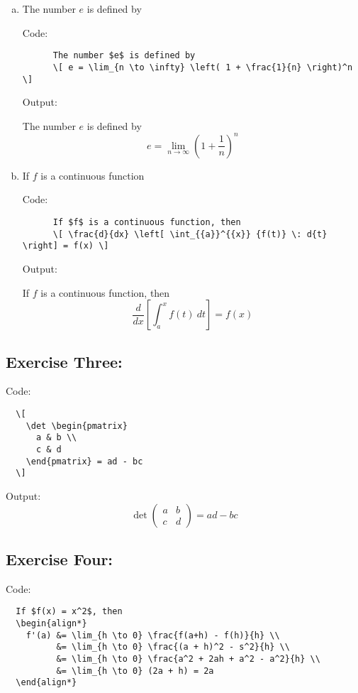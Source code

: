 \documentclass{article} %
\begin{document}
\begin{enumerate}[(a)]
  \item The number $e$ is defined by

    Code:
    \begin{verbatim}
      The number $e$ is defined by
      \[ e = \lim_{n \to \infty} \left( 1 + \frac{1}{n} \right)^n \]
    \end{verbatim}
    Output:

      The number $e$ is defined by
      \[ e = \lim_{n \to \infty} \left( 1 + \frac{1}{n} \right)^n \]
  \item If $f$ is a continuous function

    Code:
    \begin{verbatim}
      If $f$ is a continuous function, then
      \[ \frac{d}{dx} \left[ \int_{{a}}^{{x}} {f(t)} \: d{t} \right] = f(x) \]
    \end{verbatim}
    Output:

      If $f$ is a continuous function, then
      \[ \frac{d}{dx} \left[ \int_{{a}}^{{x}} {f(t)} \: d{t} \right] = f(x) \]
\end{enumerate}


\newpage
\subsection*{Exercise Three:}

Code:
\begin{verbatim}
  \[ 
    \det \begin{pmatrix}
      a & b \\
      c & d
    \end{pmatrix} = ad - bc
  \]
\end{verbatim}

Output:
  \[ 
    \det
    \begin{pmatrix}
      a & b \\
      c & d
    \end{pmatrix} = ad - bc
  \]


\newpage
\subsection*{Exercise Four:}

Code:
\begin{verbatim}
  If $f(x) = x^2$, then
  \begin{align*}
    f'(a) &= \lim_{h \to 0} \frac{f(a+h) - f(h)}{h} \\
          &= \lim_{h \to 0} \frac{(a + h)^2 - s^2}{h} \\
          &= \lim_{h \to 0} \frac{a^2 + 2ah + a^2 - a^2}{h} \\
          &= \lim_{h \to 0} (2a + h) = 2a
  \end{align*}
\end{verbatim}
\end{document}
